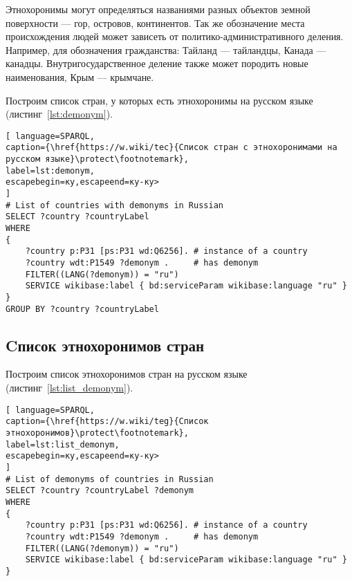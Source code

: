 Этнохоронимы могут определяться названиями разных объектов земной поверхности — гор, островов, континентов. Так же обозначение места происхождения людей может зависеть от политико-административного деления. Например, для обозначения гражданства: Тайланд — тайландцы, Канада — канадцы. Внутригосударственное деление также может породить новые наименования, Крым — крымчане.

Построим список стран, у которых есть этнохоронимы на русском языке (листинг~\ref{lst:demonym}).


\begin{lstlisting}[ language=SPARQL, 
caption={\href{https://w.wiki/tec}{Список стран с этнохоронимами на русском языке}\protect\footnotemark},
label=lst:demonym, 
escapebegin=ку,escapeend=ку-ку>
]
# List of countries with demonyms in Russian
SELECT ?country ?countryLabel 
WHERE
{
	?country p:P31 [ps:P31 wd:Q6256]. # instance of a country
	?country wdt:P1549 ?demonym .     # has demonym
	FILTER((LANG(?demonym)) = "ru")
	SERVICE wikibase:label { bd:serviceParam wikibase:language "ru" }
}
GROUP BY ?country ?countryLabel
\end{lstlisting}



\subsection{Cписок этнохоронимов стран}


Построим список этнохоронимов стран на русском языке (листинг~\ref{lst:list_demonym}).

\begin{lstlisting}[ language=SPARQL, 
caption={\href{https://w.wiki/teg}{Cписок этнохоронимов}\protect\footnotemark},
label=lst:list_demonym, 
escapebegin=ку,escapeend=ку-ку>
]
# List of demonyms of countries in Russian
SELECT ?country ?countryLabel ?demonym
WHERE
{
	?country p:P31 [ps:P31 wd:Q6256]. # instance of a country
	?country wdt:P1549 ?demonym .     # has demonym
	FILTER((LANG(?demonym)) = "ru")
	SERVICE wikibase:label { bd:serviceParam wikibase:language "ru" }
}
\end{lstlisting}

